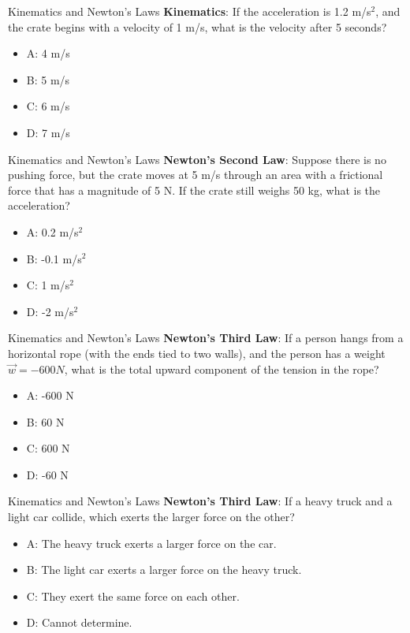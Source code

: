 \documentclass{beamer}
\begin{document}
\begin{frame}{Kinematics and Newton's Laws}
\textbf{Kinematics}: If the acceleration is 1.2 m/s$^2$, and the crate begins with a velocity of 1 m/s, what is the velocity after 5 seconds?
\begin{itemize}
\item A: 4 m/s
\item B: 5 m/s
\item C: 6 m/s
\item D: 7 m/s
\end{itemize}
\end{frame}

\begin{frame}{Kinematics and Newton's Laws}
\textbf{Newton's Second Law}: Suppose there is no pushing force, but the crate moves at 5 m/s through an area with a frictional force that has a magnitude of 5 N.  If the crate still weighs 50 kg, what is the acceleration?
\begin{itemize}
\item A: 0.2 m/s$^2$
\item B: -0.1 m/s$^2$
\item C: 1 m/s$^2$
\item D: -2 m/s$^2$
\end{itemize}
\end{frame}

\begin{frame}{Kinematics and Newton's Laws}
\textbf{Newton's Third Law}: If a person hangs from a horizontal rope (with the ends tied to two walls), and the person has a weight $\vec{w} = -600 N$, what is the total upward component of the tension in the rope?
\begin{itemize}
\item A: -600 N
\item B: 60 N
\item C: 600 N
\item D: -60 N
\end{itemize}
\end{frame}

\begin{frame}{Kinematics and Newton's Laws}
\textbf{Newton's Third Law}: If a heavy truck and a light car collide, which exerts the larger force on the other?
\begin{itemize}
\item A: The heavy truck exerts a larger force on the car.
\item B: The light car exerts a larger force on the heavy truck.
\item C: They exert the same force on each other.
\item D: Cannot determine.
\end{itemize}
\end{frame}
\end{document}
